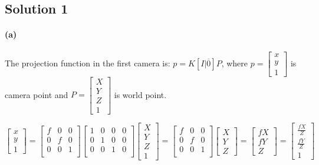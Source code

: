 \documentclass{article}
\newcommand{\solution}[1]{\clearpage \subsection*{Solution #1}}
\newcommand{\spart}[1]{\paragraph{(#1)}}
\begin{document}
 

\solution{1} 

\spart{a}
The projection function in the first camera is: $p = K[I|\overline{0}] P$, 
where $p = \begin{bmatrix}
  x \\ y \\ 1
\end{bmatrix}$ is camera point and $P = \begin{bmatrix}
  X \\ Y \\ Z \\ 1
\end{bmatrix}$ is world point.

$$
  \begin{bmatrix}
    x \\ y \\ 1
  \end{bmatrix} = \begin{bmatrix}
    f & 0 & 0 \\ 0 & f & 0 \\ 0 & 0 & 1 \\
  \end{bmatrix}\begin{bmatrix}
    1 & 0 & 0 & 0 \\
    0 & 1 & 0 & 0 \\
    0 & 0 & 1 & 0 \\
  \end{bmatrix}\begin{bmatrix}
    X \\ Y \\ Z \\ 1
  \end{bmatrix} = \begin{bmatrix}
    f & 0 & 0 \\
    0 & f & 0 \\
    0 & 0 & 1 \\
  \end{bmatrix}\begin{bmatrix}
    X \\ Y \\ Z
  \end{bmatrix} = \begin{bmatrix}
    fX \\ fY \\ Z
  \end{bmatrix} = \begin{bmatrix}
    \frac{fX}{Z} \\ \frac{fY}{Z} \\ 1
  \end{bmatrix} 
$$
\end{document}
